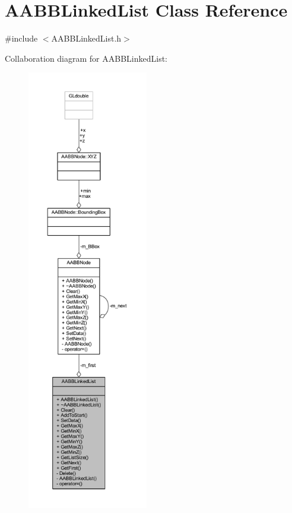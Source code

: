 \hypertarget{class_a_a_b_b_linked_list}{}\section{A\+A\+B\+B\+Linked\+List Class Reference}
\label{class_a_a_b_b_linked_list}


{\ttfamily \#include $<$A\+A\+B\+B\+Linked\+List.\+h$>$}



Collaboration diagram for A\+A\+B\+B\+Linked\+List\+:
\nopagebreak
\begin{figure}[H]
\begin{center}
\leavevmode
\includegraphics[height=550pt]{class_a_a_b_b_linked_list__coll__graph}
\end{center}
\end{figure}
